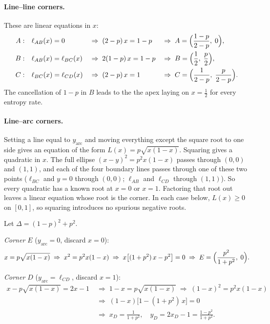 \documentclass[11pt]{article}
\begin{document}
\paragraph{Line--line corners.} These are linear equations in $x$:
\begin{align*}
A:&\quad \ell_{AB}(x)=0 &&\Rightarrow\; (2-p)\,x = 1-p
  &&\Rightarrow\; A=\Bigl(\frac{1-p}{2-p},\;0\Bigr),\\
B:&\quad \ell_{AB}(x)=\ell_{BC}(x) &&\Rightarrow\; 2(1-p)\,x = 1-p
  &&\Rightarrow\; B=\Bigl(\frac12,\;\frac p2\Bigr),\\
C:&\quad \ell_{BC}(x)=\ell_{CD}(x) &&\Rightarrow\; (2-p)\,x = 1
  &&\Rightarrow\; C=\Bigl(\frac{1}{2-p},\;\frac{p}{2-p}\Bigr).
\end{align*}
The cancellation of $1-p$ in $B$ leads to the the apex laying
on $x=\tfrac12$ for every entropy rate.

\paragraph{Line--arc corners.} Setting a line equal to $y_{\mathrm{arc}}$
and moving everything except the square root to one side gives an equation
of the form $L(x)=p\sqrt{x(1-x)}$. Squaring gives a quadratic in $x$. The
full ellipse $(x-y)^2=p^2x(1-x)$ passes through $(0,0)$ and $(1,1)$, and each
of the four boundary lines passes through one of these two points
($\ell_{BC}$ and $y=0$ through $(0,0)$; $\ell_{AB}$ and $\ell_{CD}$ through
$(1,1)$). So every quadratic has a known root at $x=0$ or $x=1$. Factoring
that root out leaves a linear equation whose root is the corner. In each case
below, $L(x)\ge0$ on $[0,1]$, so squaring introduces no spurious negative roots.

\vspace{8pt}

Let $\Delta=(1-p)^2+p^2$.

\vspace{8pt}

\emph{Corner $E$} ($y_{\mathrm{arc}}=0$, discard $x=0$):
\begin{align*}
x = p\sqrt{x(1-x)}
\;\Rightarrow\; x^2 = p^2x(1-x)
\;\Rightarrow\; x\bigl[(1+p^2)\,x-p^2\bigr]=0
\;\Rightarrow\; E=\Bigl(\frac{p^2}{1+p^2},\;0\Bigr).
\end{align*}

\emph{Corner $D$} ($y_{\mathrm{arc}}=\ell_{CD}$, discard $x=1$):
\begin{align*}
x-p\sqrt{x(1-x)}=2x-1
&\;\Rightarrow\; 1-x = p\sqrt{x(1-x)}
\;\Rightarrow\; (1-x)^2 = p^2x(1-x)\\
&\;\Rightarrow\; (1-x)\bigl[1-(1+p^2)\,x\bigr]=0\\
&\;\Rightarrow\; x_D=\frac{1}{1+p^2},\quad y_D=2x_D-1=\frac{1-p^2}{1+p^2}.
\end{align*}
\end{document}
